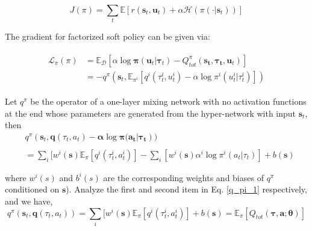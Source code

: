 \begin{equation}
J(\pi)=\sum_{t} \mathbb{E}\left[r\left(\mathbf{s}_{t}, \mathbf{u}_{t}\right)+\alpha \mathcal{H}\left(\pi\left(\cdot | \mathbf{s}_{t}\right)\right)\right]
\end{equation}

 The gradient for factorized soft policy can be given via:

\begin{equation}
\begin{array}{l}
\begin{aligned}
\mathcal{L}_{\pi}(\pi) &=\mathbb{E}_{\mathcal{D}}\left[\alpha \log \boldsymbol{\pi}\left(\boldsymbol{u}_{t} | \boldsymbol{\tau}_{t}\right)-Q^{\pi}_{tot}\left(\boldsymbol{s_{t}}, \boldsymbol{\tau_{t}}, \boldsymbol{u}_{t}\right)\right] \\
&= -q^{\pi}\left(\boldsymbol{s}_{t}, \mathbb{E}_{\pi^{i}}\left[q^{i}\left(\tau_{t}^{i}, u_{t}^{i}\right)-\alpha \log \pi^{i}\left(u_{t}^{i} | \tau_{t}^{i}\right)\right]\right)
\end{aligned}
\end{array}
\end{equation}



Let  $q^{\pi}$ be the operator of a one-layer mixing network with no activation functions at the end whose parameters are generated from the hyper-network with input $\boldsymbol{s}_{t}$, then
\begin{equation}
\begin{aligned}
& q^{\pi}(\boldsymbol{s}_{t}, \boldsymbol{q}(\tau_{t}, a_{t}) - \boldsymbol{\alpha} \log \boldsymbol{\pi(a_{t}| \tau_{t}})) 
\\  \\
& = \sum_{i}[ w^{i}(\boldsymbol{s}) \mathbb{E}_{\pi} [q^{i}(\tau_{t}^{i}, a_{t}^{i})]  - \sum_{i}[ w^{i}(\boldsymbol{s})\alpha^{i} \log {\pi^{i}}({a}_{t} |{\tau}_{t})] + b(\boldsymbol{s}) 
\label{q_pi_1}
\end{aligned}
\end{equation}


where $ w^{i}(s)$ and $b^{i}(s)$ are the corresponding weights and biases of $q^{\pi}$ conditioned on $\boldsymbol{s}$).
Analyze  the first  and second item in Eq. \ref{q_pi_1} respectively, and we have,
\begin{equation}
q^{\pi}(\boldsymbol{s}_{t}, \boldsymbol{q}(\tau_{t}, a_{t})) = \sum_{i}[ w^{i}(\boldsymbol{s}) \mathbb{E}_{\pi} [q^{i}(\tau_{t}^{i}, a_{t}^{i})] + b(\boldsymbol{s}) = \mathbb{E}_{\pi} [Q_{tot}(\boldsymbol{\tau}, \boldsymbol{a} ; \boldsymbol{\theta})] 
\label{q_pi_2}
\end{equation}

